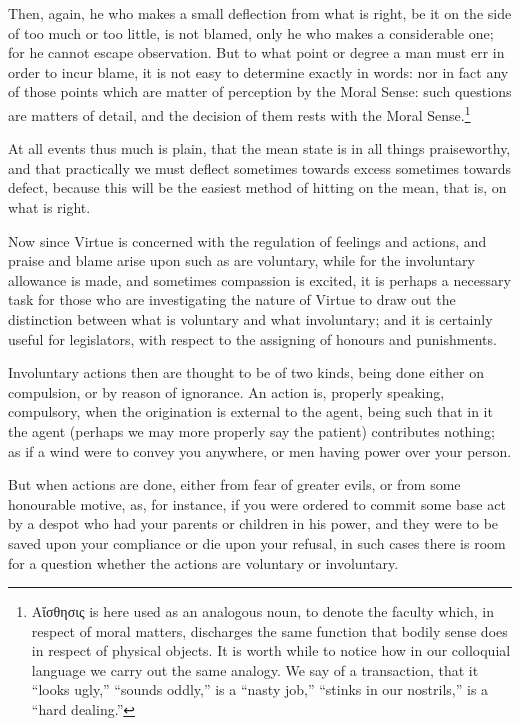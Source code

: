 Then, again, he who makes a small deflection from what is right, be it on the
side of too much or too little, is not blamed, only he who makes a considerable
one; for he cannot escape observation. But to what point or degree a man must
err in order to incur blame, it is not easy to determine exactly in words: nor
in fact any of those points which are matter of perception by the Moral Sense:
such questions are matters of detail, and the decision of them rests with the
Moral Sense.\footnote{Αἴσθησις is here used as an analogous
noun, to denote the faculty which, in respect of moral matters, discharges the
same function that bodily sense does in respect of physical objects. It is
worth while to notice how in our colloquial language we carry out the same
analogy. We say of a transaction, that it “looks ugly,”
“sounds oddly,” is a “nasty job,” “stinks in our
nostrils,” is a “hard dealing.”}

At all events thus much is plain, that the mean state is in all things
praiseworthy, and that practically we must deflect sometimes towards excess
sometimes towards defect, because this will be the easiest method of hitting on
the mean, that is, on what is right.



Now since Virtue is concerned with the regulation of feelings and actions, and
praise and blame arise upon such as are voluntary, while for the involuntary
allowance is made, and sometimes compassion is excited, it is perhaps a
necessary task for those who are investigating the nature of Virtue to draw out
the distinction between what is voluntary and what involuntary; and it is
certainly useful for legislators, with respect to the assigning of honours and
punishments.

Involuntary actions then are thought to be of two kinds, being done either on
compulsion, or by reason of ignorance. An action is, properly speaking,
compulsory, when the origination is external to the agent, being such that in
it the agent (perhaps we may more properly say the patient) contributes
nothing; as if a wind were to convey you anywhere, or men having power over
your person.

But when actions are done, either from fear of greater evils, or from some
honourable motive, as, for instance, if you were ordered to commit some base
act by a despot who had your parents or children in his power, and they were to
be saved upon your compliance or die upon your refusal, in such cases there is
room for a question whether the actions are voluntary or involuntary.

